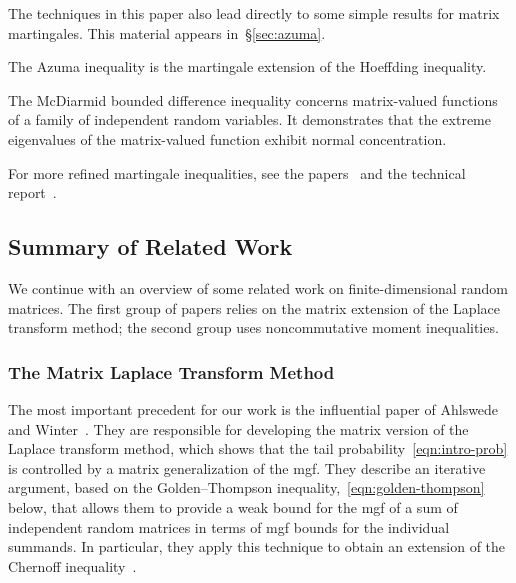 \documentclass[11pt,letterpaper,twoside,reqno,draft]{amsart}
\theoremstyle{remark}
\numberwithin{equation}{section}
\numberwithin{thm}{section}
\begin{document}
The techniques in this paper also lead directly to some simple results for matrix martingales.  This material appears in~\S\ref{sec:azuma}.  

\begin{description} \setlength{\itemsep}{0.5pc}
\item[Azuma Inequality]
The Azuma inequality is the martingale extension of the Hoeffding inequality.

\item[McDiarmid Inequality]
The McDiarmid bounded difference inequality concerns matrix-valued functions of a family of independent random variables.  It demonstrates that the extreme eigenvalues of the matrix-valued function exhibit normal concentration.
\end{description}

\noindent
For more refined martingale inequalities, see the papers~\cite{Oli10:Concentration-Adjacency,Tro11:Freedmans-Inequality} and the technical report~\cite{Tro11:User-Friendly-Martingale-TR}.

\subsection{Summary of Related Work} \label{sec:related}

We continue with an overview of some related work on finite-dimensional random matrices.  The first group of papers relies on the matrix extension of the Laplace transform method; the second group uses noncommutative moment inequalities.  

\subsubsection{The Matrix Laplace Transform Method}

The most important precedent for our work is the influential paper of Ahlswede and Winter~\cite{AW02:Strong-Converse}.  They are responsible for developing the matrix version of the Laplace transform method, which shows that the tail probability~\eqref{eqn:intro-prob} is controlled by a matrix generalization of the mgf.  They describe an iterative argument, based on the Golden--Thompson inequality,~\eqref{eqn:golden-thompson} below, that allows them to provide a weak bound for the mgf of a sum of independent random matrices in terms of mgf bounds for the individual summands.  In particular, they apply this technique to obtain an extension of the Chernoff inequality~\cite[Thm.~19]{AW02:Strong-Converse}.
\end{document}
